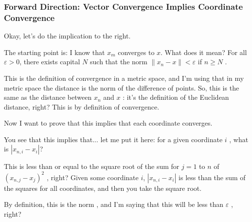 \begin{proofWrapper}

\subsubsection{Forward Direction: Vector Convergence Implies Coordinate Convergence}

\begin{speech}[01:06:45 - 01:07:47]
 Okay, let's do the implication to the right. 

The starting point is: I know that $x_m$ converges to $x$.  What does it mean?  For all $\varepsilon > 0$, there exists capital $N$ such that the norm $\|x_n - x\| < \varepsilon$  if $n \ge N$ .

This is the definition of convergence in a metric space, and I'm using that in my metric space the distance is the norm of the difference of points. So, this is the same as the distance between $x_n$ and $x$ : it's the definition of the Euclidean distance, right? This is by definition of convergence.
\end{speech}

\begin{speech}[01:07:47 - 01:09:17]
Now I want to prove that this implies that each coordinate converges.

You see that this implies that... let me put it here:  for a given coordinate $i$ , what is $|x_{n,i} - x_i|$?

This is less than or equal to the square root of the sum for $j = 1$ to $n$ of $(x_{n,j} - x_j)^2$ , right? Given some coordinate $i$, $|x_{n,i} - x_i|$ is less than the sum of the squares for all coordinates, and then you take the square root.

By definition, this is the norm , and I'm saying that this will be less than $\varepsilon$ , right?
\end{speech}


\end{proofWrapper}

